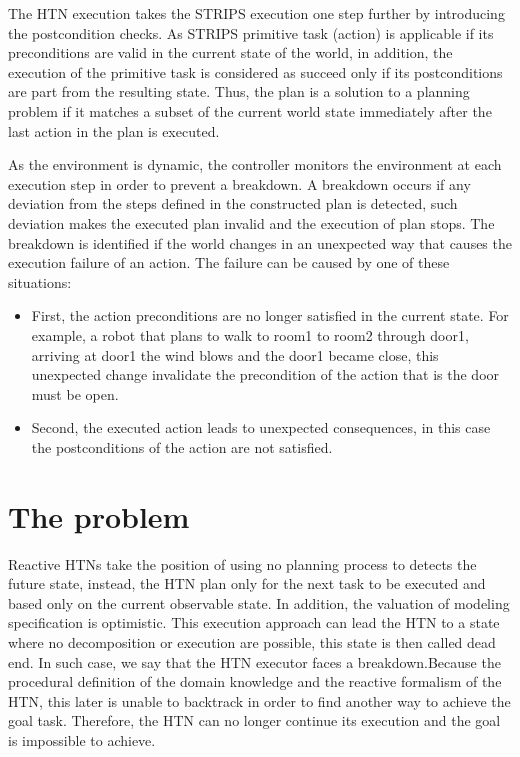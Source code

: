 The HTN execution takes the STRIPS execution one step further by introducing the postcondition checks. As STRIPS primitive task (action) is applicable if its preconditions are valid in the current state of the world, in addition, the execution of the primitive task is considered as succeed only if its postconditions are part from the resulting state. 
Thus, the plan is a solution to a planning problem if it matches a subset of the current world state immediately after the last action in the plan is executed.


As the environment is dynamic, the controller monitors the environment at each execution step in order to prevent a breakdown. A breakdown occurs if any deviation from the steps defined in the constructed plan is detected, such deviation makes the executed plan invalid and the execution of plan stops. 
The breakdown is identified if the world changes in an unexpected way that causes the execution failure of an action. The failure can be caused by one of these situations:
\begin{itemize}
\item First, the action preconditions are no longer satisfied in the current state. For example, a robot that plans to walk to room1 to room2 through door1, arriving at door1 the wind blows and the door1 became close, this unexpected change invalidate the precondition of the action  that is the door must be open. 
\item	Second, the executed action leads to unexpected consequences, in this case the postconditions of the action are not satisfied.

\end{itemize}

\section{The problem}Reactive HTNs take the position of using no planning process to detects the future state, instead, the HTN plan only for the  next task  to be executed and based only on the current observable state.  In addition, the  valuation of modeling specification is optimistic. This execution approach can lead the HTN to a state where no decomposition or execution are possible, this state is then called dead end. In such case, we say that the HTN executor faces a breakdown.Because the procedural definition of the domain knowledge and the reactive formalism of the HTN, this later is unable to backtrack in order to find another way to achieve the goal task. Therefore, the HTN can no longer continue its execution and the goal is impossible to achieve. 
